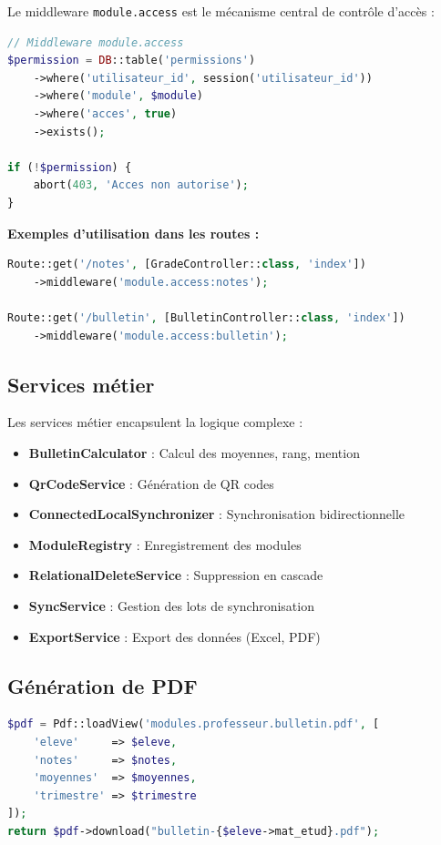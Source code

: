 \documentclass[12pt,a4paper,twoside]{report}
\begin{document}
Le middleware \texttt{module.access} est le mécanisme central de contrôle d'accès :

\begin{lstlisting}[language=PHP]
// Middleware module.access
$permission = DB::table('permissions')
    ->where('utilisateur_id', session('utilisateur_id'))
    ->where('module', $module)
    ->where('acces', true)
    ->exists();

if (!$permission) {
    abort(403, 'Acces non autorise');
}
\end{lstlisting}

\textbf{Exemples d'utilisation dans les routes :}
\begin{lstlisting}[language=PHP]
Route::get('/notes', [GradeController::class, 'index'])
    ->middleware('module.access:notes');

Route::get('/bulletin', [BulletinController::class, 'index'])
    ->middleware('module.access:bulletin');
\end{lstlisting}

\subsection{Services métier}

Les services métier encapsulent la logique complexe :
\begin{itemize}
    \item \textbf{BulletinCalculator} : Calcul des moyennes, rang, mention
    \item \textbf{QrCodeService} : Génération de QR codes
    \item \textbf{ConnectedLocalSynchronizer} : Synchronisation bidirectionnelle
    \item \textbf{ModuleRegistry} : Enregistrement des modules
    \item \textbf{RelationalDeleteService} : Suppression en cascade
    \item \textbf{SyncService} : Gestion des lots de synchronisation
    \item \textbf{ExportService} : Export des données (Excel, PDF)
\end{itemize}

\subsection{Génération de PDF}

\begin{lstlisting}[language=PHP]
$pdf = Pdf::loadView('modules.professeur.bulletin.pdf', [
    'eleve'     => $eleve,
    'notes'     => $notes,
    'moyennes'  => $moyennes,
    'trimestre' => $trimestre
]);
return $pdf->download("bulletin-{$eleve->mat_etud}.pdf");
\end{lstlisting}
\end{document}
